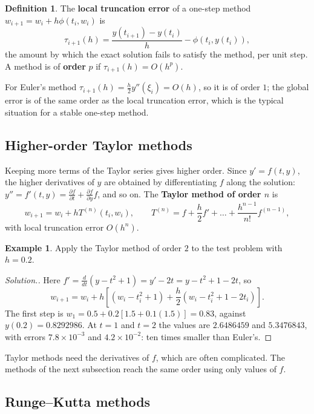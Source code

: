 \documentclass[11pt,a4paper]{article}
\numberwithin{equation}{section}
\theoremstyle{definition}
\newtheorem{defn}[thm]{Definition}
\newtheorem{exa}[thm]{Example}
\newenvironment{solution}
  {\renewcommand{\qedsymbol}{}\begin{proof}[\textit{Solution}.]}
  {\end{proof}}
\begin{document}
\begin{defn}
The \textbf{local truncation error} of a one-step method $w_{i+1} = w_i+h\phi(t_i,w_i)$ is
$$\tau_{i+1}(h) = \frac{y(t_{i+1})-y(t_i)}{h}-\phi(t_i,y(t_i)),$$
the amount by which the exact solution fails to satisfy the method, per unit step. A method is of \textbf{order} $p$ if $\tau_{i+1}(h) = O(h^p)$.
\end{defn}

For Euler's method $\tau_{i+1}(h) = \frac h2y''(\xi_i) = O(h)$, so it is of order $1$; the global error is of the same order as the local
truncation error, which is the typical situation for a stable one-step method.


\subsection{Higher-order Taylor methods}
\label{sec:taylormethods}

Keeping more terms of the Taylor series gives higher order. Since $y' = f(t,y)$, the higher derivatives of $y$ are obtained by
differentiating $f$ along the solution: $y'' = f'(t,y) = \frac{\partial f}{\partial t}+\frac{\partial f}{\partial y}f$, and so on. The
\textbf{Taylor method of order $n$} is
$$w_{i+1} = w_i+hT^{(n)}(t_i,w_i),\qquad T^{(n)} = f+\frac h2f'+\dots+\frac{h^{n-1}}{n!}f^{(n-1)},$$
with local truncation error $O(h^n)$.

\begin{exa}
\label{exa:taylor2}
Apply the Taylor method of order $2$ to the test problem with $h = 0.2$.
\end{exa}

\begin{solution}
Here $f' = \frac{d}{dt}(y-t^2+1) = y'-2t = y-t^2+1-2t$, so
$$w_{i+1} = w_i+h\left[(w_i-t_i^2+1)+\frac h2(w_i-t_i^2+1-2t_i)\right] .$$
The first step is $w_1 = 0.5+0.2[1.5+0.1(1.5)] = 0.83$, against $y(0.2) = 0.8292986$. At $t = 1$ and $t = 2$ the values are $2.6486459$ and
$5.3476843$, with errors $7.8\times10^{-3}$ and $4.2\times10^{-2}$: ten times smaller than Euler's.
\end{solution}

Taylor methods need the derivatives of $f$, which are often complicated. The methods of the next subsection reach the same order using
only values of $f$.


\subsection{Runge--Kutta methods}
\label{sec:rk}
\end{document}
